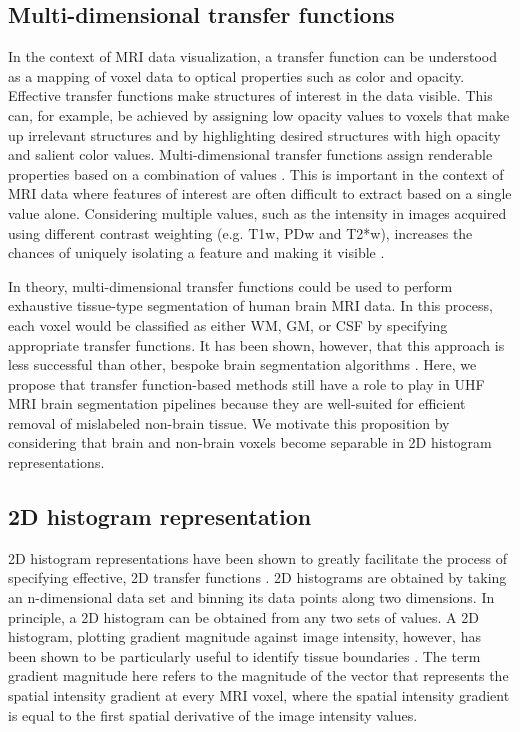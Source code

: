 \subsection{Multi-dimensional transfer functions}
In the context of MRI data visualization, a transfer function can be understood as a mapping of voxel data to optical properties such as color and opacity. Effective transfer functions make structures of interest in the data visible. This can, for example, be achieved by assigning low opacity values to voxels that make up irrelevant structures and by highlighting desired structures with high opacity and salient color values. Multi-dimensional transfer functions assign renderable properties based on a combination of values \cite{Kniss2002, Kindlmann1998, Kniss2005, Kniss2001}. This is important in the context of MRI data where features of interest are often difficult to extract based on a single value alone. Considering multiple values, such as the intensity in images acquired using different contrast weighting (e.g. T1w, PDw and T2*w), increases the chances of uniquely isolating a feature and making it visible \cite{Kniss2002}.

In theory, multi-dimensional transfer functions could be used to perform exhaustive tissue-type segmentation of human brain MRI data. In this process, each voxel would be classified as either WM, GM, or CSF by specifying appropriate transfer functions. It has been shown, however, that this approach is less successful than other, bespoke brain segmentation algorithms \cite{Ljung2016}. Here, we propose that transfer function-based methods still have a role to play in UHF MRI brain segmentation pipelines because they are well-suited for efficient removal of mislabeled non-brain tissue. We motivate this proposition by considering that brain and non-brain voxels become separable in 2D histogram representations.

\subsection{2D histogram representation}
2D histogram representations have been shown to greatly facilitate the process of specifying effective, 2D transfer functions \cite{Kindlmann1998, Kniss2005}. 2D histograms are obtained by taking an n-dimensional data set and binning its data points along two dimensions. In principle, a 2D histogram can be obtained from any two sets of values. A 2D histogram, plotting gradient magnitude against image intensity, however, has been shown to be particularly useful to identify tissue boundaries \cite{Kindlmann1998, Kniss2005}. The term gradient magnitude here refers to the magnitude of the vector that represents the spatial intensity gradient at every MRI voxel, where the spatial intensity gradient is equal to the first spatial derivative of the image intensity values.

